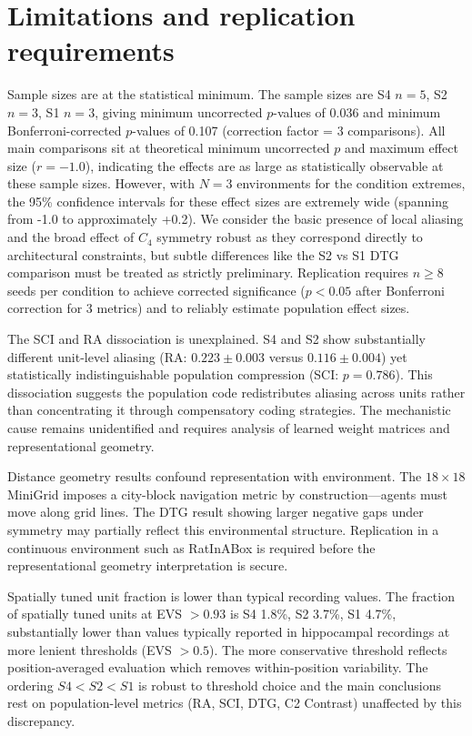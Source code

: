 \documentclass[11pt, a4paper]{article}
\begin{document}
\clearpage

\section*{Limitations and replication requirements}

Sample sizes are at the statistical minimum. The sample sizes are S4 $n=5$, S2 $n=3$, S1 $n=3$, giving minimum uncorrected $p$-values of 0.036 and minimum Bonferroni-corrected $p$-values of 0.107 (correction factor = 3 comparisons). All main comparisons sit at theoretical minimum uncorrected $p$ and maximum effect size ($r = -1.0$), indicating the effects are as large as statistically observable at these sample sizes. However, with $N=3$ environments for the condition extremes, the 95\% confidence intervals for these effect sizes are extremely wide (spanning from -1.0 to approximately +0.2). We consider the basic presence of local aliasing and the broad effect of $C_4$ symmetry robust as they correspond directly to architectural constraints, but subtle differences like the S2 vs S1 DTG comparison must be treated as strictly preliminary. Replication requires $n \geq 8$ seeds per condition to achieve corrected significance ($p < 0.05$ after Bonferroni correction for 3 metrics) and to reliably estimate population effect sizes.

The SCI and RA dissociation is unexplained. S4 and S2 show substantially different unit-level aliasing (RA: $0.223 \pm 0.003$ versus $0.116 \pm 0.004$) yet statistically indistinguishable population compression (SCI: $p = 0.786$). This dissociation suggests the population code redistributes aliasing across units rather than concentrating it through compensatory coding strategies. The mechanistic cause remains unidentified and requires analysis of learned weight matrices and representational geometry.

Distance geometry results confound representation with environment. The $18 \times 18$ MiniGrid imposes a city-block navigation metric by construction---agents must move along grid lines. The DTG result showing larger negative gaps under symmetry may partially reflect this environmental structure. Replication in a continuous environment such as RatInABox is required before the representational geometry interpretation is secure.

Spatially tuned unit fraction is lower than typical recording values. The fraction of spatially tuned units at EVS $> 0.93$ is S4 1.8\%, S2 3.7\%, S1 4.7\%, substantially lower than values typically reported in hippocampal recordings at more lenient thresholds (EVS $> 0.5$). The more conservative threshold reflects position-averaged evaluation which removes within-position variability. The ordering $S4 < S2 < S1$ is robust to threshold choice and the main conclusions rest on population-level metrics (RA, SCI, DTG, C2 Contrast) unaffected by this discrepancy.
\end{document}

